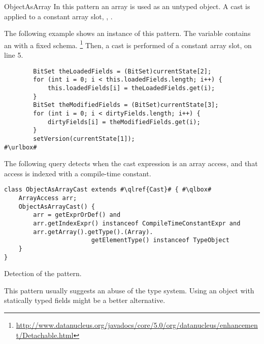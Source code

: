 \begin{pattern}{ObjectAsArray}
In this pattern an array is used as an untyped object.
A cast is applied to a constant array slot, \eg, .

\instances{}
The following example shows an instance of this pattern.
The variable  contains an  with a fixed schema.%
\footnote{\url{http://www.datanucleus.org/javadocs/core/5.0/org/datanucleus/enhancement/Detachable.html}}
Then, a cast is performed of a constant array slot,
 on line 5.

\def\urlvar{http://bit.ly/datanucleus_datanucleus_core_2S1L5Zf}
\begin{verbatim}
        BitSet theLoadedFields = (BitSet)currentState[2];
        for (int i = 0; i < this.loadedFields.length; i++) {
            this.loadedFields[i] = theLoadedFields.get(i);
        }
        BitSet theModifiedFields = (BitSet)currentState[3];
        for (int i = 0; i < dirtyFields.length; i++) {
            dirtyFields[i] = theModifiedFields.get(i);
        }
        setVersion(currentState[1]);
#\urlbox#
\end{verbatim}


\detection{}
The following query detects when the cast expression is an array access,
and that access is indexed with a compile-time constant.

\begin{listing}
\begin{verbatim}
class ObjectAsArrayCast extends #\qlref{Cast}# { #\qlbox#
	ArrayAccess arr;
	ObjectAsArrayCast() {
		arr = getExprOrDef() and
		arr.getIndexExpr() instanceof CompileTimeConstantExpr and
		arr.getArray().getType().(Array).
						getElementType() instanceof TypeObject
	}
}
\end{verbatim}
\caption{Detection of the \thisp{} pattern.}
\end{listing}

\issues{}
This pattern usually suggests an abuse of the type system.
Using an object with statically typed fields might be a better alternative.

\end{pattern}
